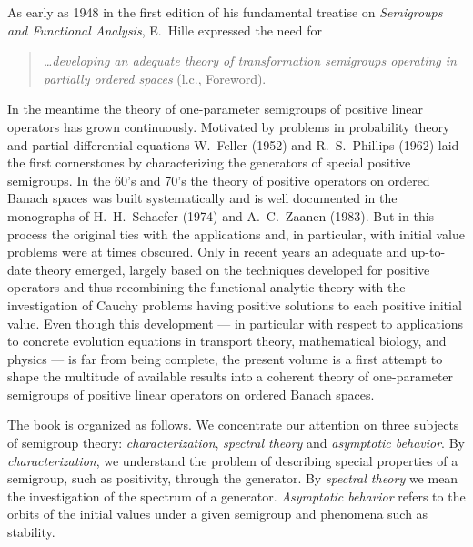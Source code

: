 %

\preface

As early as 1948 in the first edition of his fundamental treatise on \emph{Semigroups and Functional Analysis}, E.~Hille expressed the need for 

\begin{quote}
\textit{\ldots developing an adequate theory of transformation semigroups operating in partially ordered spaces} (l.c., Foreword). 
\end{quote}

In the meantime the theory of one-parameter semigroups of positive linear operators has grown continuously. 
Motivated by problems in probability theory and partial differential equations W.~Feller (1952) and R.~S.~Phillips (1962) laid the first cornerstones by characterizing the generators of special positive semigroups. 
In the 60's and 70's the theory of positive operators on ordered Banach spaces was built systematically and is well documented in the monographs of H.~H.~Schaefer (1974) and A.~C.~Zaanen (1983). 
But in this process the original ties with the applications and, in particular, with initial value problems were at times obscured. 
Only in recent years an adequate and up-to-date theory emerged, largely based on the techniques developed for positive operators and thus recombining the functional analytic theory with the investigation of Cauchy problems having positive solutions to each positive initial value. 
Even though this development --- in particular with respect to applications to concrete evolution equations in transport theory, mathematical biology, and physics --- is far from being complete, the present volume is a first attempt to shape the multitude of available results into a coherent theory of one-parameter semigroups of positive linear operators on ordered Banach spaces.

The book is organized as follows.
We concentrate our attention on three subjects of semigroup theory: \emph{characterization}, \emph{spectral theory} and \emph{asymptotic behavior}. 
By \emph{characterization}, we understand the problem of describing special properties of a semigroup, such as positivity, through the generator. 
By \emph{spectral theory} we mean the investigation of the spectrum of a generator. 
\emph{Asymptotic behavior} refers to the orbits of the initial values under a given semigroup and phenomena such as stability.

